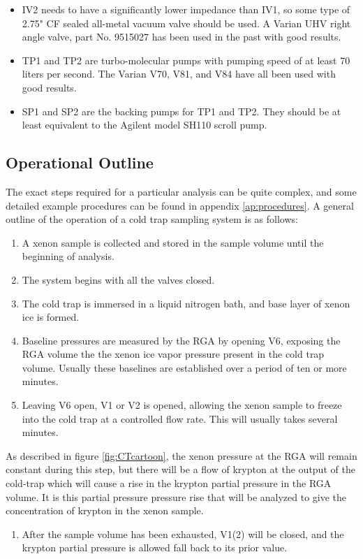 \documentclass[12pt]{article}
\begin{document}
\begin{itemize}
\item IV2 needs to have a significantly lower impedance than IV1, so some type of 2.75" CF sealed all-metal vacuum valve should be used. A Varian UHV right angle valve, part No. 9515027 has been used in the past with good results.
\item TP1 and TP2 are turbo-molecular pumps with pumping speed of at least 70 liters per second. The Varian V70, V81, and V84 have all been used with good results.
\item SP1 and SP2 are the backing pumps for TP1 and TP2. They should be at least equivalent to the Agilent model SH110 scroll pump.
\end{itemize}  

\subsection{Operational Outline}
\label{sec:outline}
The exact steps required for a particular analysis can be quite complex, and some detailed example procedures can be found in  appendix \ref{ap:procedures}. A general outline of the operation of a cold trap sampling system is as follows:
\begin{enumerate}
\item A xenon sample is collected and stored in the sample volume until the beginning of analysis.
\item The system begins with all the valves closed.
\item  \label{step:analysis_start} The cold trap is immersed in a liquid nitrogen bath, and base layer of xenon ice is formed.
\item Baseline pressures are measured by the RGA by opening V6, exposing the RGA volume the the xenon ice vapor pressure present in the cold trap volume. Usually these baselines are established over a period of ten or more minutes.
\item \label{step:start_flow} Leaving V6 open, V1 or V2 is opened, allowing the xenon sample to freeze into the cold trap at a controlled flow rate. This will usually takes several minutes. 
\end{enumerate}
\noindent As described in figure \ref{fig:CTcartoon}, the xenon pressure at the RGA will remain constant during this step, but there will be a flow of krypton at the output of the cold-trap which will cause a rise in the krypton partial pressure in the RGA volume. It is this partial pressure pressure rise that will be analyzed to give the concentration of krypton in the xenon sample.
\begin{enumerate}[resume]
\item \label{step:stop_flow}After the sample volume has been exhausted, V1(2) will be closed, and the krypton partial pressure is allowed fall back to its prior value.
\end{enumerate}
\end{document}
